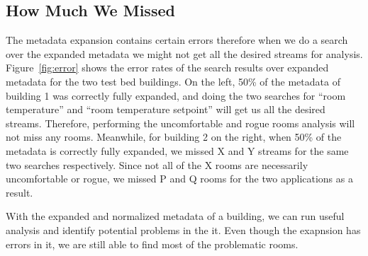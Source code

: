 
\subsection{How Much We Missed}
The metadata expansion contains certain errors therefore when we do a search over the expanded metadata we might not get all the desired streams for analysis. Figure~\ref{fig:error} shows the error rates of the search results over expanded metadata for the two test bed buildings. On the left, 50\% of the metadata of building 1 was correctly fully expanded, and doing the two searches for ``room temperature'' and ``room temperature setpoint'' will get us all the desired streams. Therefore, performing the uncomfortable and rogue rooms analysis will not miss any rooms. Meanwhile, for building 2 on the right, when 50\% of the metadata is correctly fully expanded, we missed X and Y streams for the same two searches respectively. Since not all of the X rooms are necessarily uncomfortable or rogue, we missed P and Q rooms for the two applications as a result.

With the expanded and normalized metadata of a building, we can run useful analysis and identify potential problems in the it. Even though the exapnsion has errors in it, we are still able to find most of the problematic rooms.

